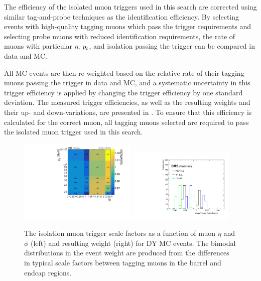 The efficiency of the isolated muon triggers used in this search are corrected using similar tag-and-probe techniques as the identification efficiency. 
By selecting events with high-quality tagging muons which pass the trigger requirements and selecting probe muons with reduced identification requirements, the rate of muons with particular $\eta$, $p_t$, and isolation passing the trigger can be compared in data and MC.

All MC events are then re-weighted based on the relative rate of their tagging muons passing the trigger in data and MC, and a systematic uncertainty in this trigger efficiency is applied by changing the trigger efficiency by one standard deviation.
The measured trigger efficiencies, as well as the resulting weights and their up- and down-variations, are presented in .
To ensure that this efficiency is calculated for the correct muon, all tagging muons selected are required to pass the isolated muon trigger used in this search.

\begin{figure}[htbp]
	\centering
	\includegraphics[width=0.5\textwidth]{figures/muTrigEff_2018.pdf}
        \hspace{0.01\textwidth}
        \includegraphics[width=0.45\textwidth]{figures/trigSF.pdf}
	\caption[Muon Trigger Scale Factors and Weights]{The isolation muon trigger scale factors as a function of muon $\eta$ and $\phi$ (left) and resulting weight (right) for DY MC events. The bimodal distributions in the event weight are produced from the differences in typical scale factors between tagging muons in the barrel and endcap regions.}
        \label{fig:muTrigSFs}
\end{figure}

